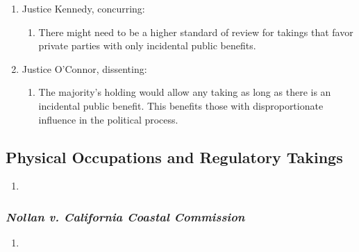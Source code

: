 \begin{enumerate}
\begin{enumerate}
    \end{enumerate}
    \item Justice Kennedy, concurring:
    \begin{enumerate}
        \item There might need to be a higher standard of review for takings 
        that favor private parties with only incidental public benefits.
    \end{enumerate}
    \item Justice O'Connor, dissenting:
    \begin{enumerate}
        \item The majority's holding would allow any taking as long as there 
        is an incidental public benefit. This benefits those with 
        disproportionate influence in the political process.
    \end{enumerate}
\end{enumerate}

\subsection{Physical Occupations and Regulatory Takings}
 
\begin{enumerate}
    \item %
 \end{enumerate}

\subsubsection{\emph{Nollan v. California Coastal Commission}}

\begin{enumerate}
    \item %
\end{enumerate}
 
